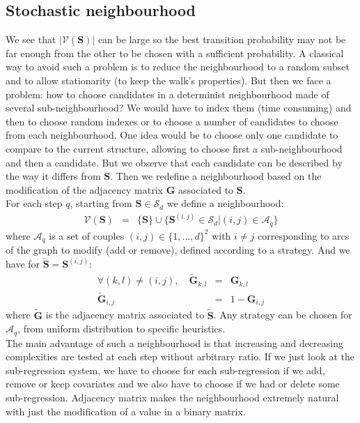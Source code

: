 \documentclass[12pt,a4paper]{report}
\begin{document}
	\subsection{Stochastic neighbourhood}
	We see that $|\mathcal{V}(\boldsymbol{S})|$ can be large so the best transition probability may not be far enough from the other to be chosen with a sufficient probability. A classical way to avoid such a problem is to reduce the neighbourhood to a random subset and to allow stationarity (to keep the walk's properties). But then we face a problem: how to choose candidates in a determinist neighbourhood made of several sub-neighbourhood? We would have to index them (time consuming) and then to choose random indexes or to choose a number of candidates to choose from each neighbourhood. One idea would be to choose only one candidate to compare to the current structure, allowing to choose first a sub-neighbourhood and then a candidate. But we observe that each candidate can be described by the way it differs from $\boldsymbol{S}$. Then we redefine a neighbourhood based on the modification of the adjacency matrix $\boldsymbol{G}$ associated to $\boldsymbol{S}$.\\
	
	For each step $q$, starting from $\boldsymbol{S} \in \mathcal{S}_d$ we define a neighbourhood:
		\begin{eqnarray}
		\mathcal{V}(\boldsymbol{S})&=& \{\boldsymbol{S} \}\cup \{ \boldsymbol{S}^{(i,j)} \in \mathcal{S}_d|(i,j) \in \mathcal{A}_q\} 
	\end{eqnarray}	
	where $\mathcal{A}_q$ is a set of couples $(i,j) \in \{1,\dots,d \}^2$ with $i\neq j$ corresponding to arcs of the graph to modify (add or remove), defined according to a strategy.
	And we have for  $\tilde{\boldsymbol{S}}=\boldsymbol{S}^{(i,j)}$:
	\begin{eqnarray}
		\forall (k,l)\neq (i,j), \quad	\tilde{\boldsymbol{G}}_{k,l}&=&\boldsymbol{G}_{k,l} \\
		\tilde{\boldsymbol{G}}_{i,j}&=&1-\boldsymbol{G}_{i,j} 
	\end{eqnarray}
	where $\tilde{\boldsymbol{G}}$ is the adjacency matrix associated to $\tilde{\boldsymbol{S}}$. Any strategy can be chosen for $\mathcal{A}_q$, from uniform distribution to specific heuristics.\\
	
The main advantage of such a neighbourhood is that increasing and decreasing complexities are tested at each step without arbitrary ratio. If we just look at the sub-regression system, we have to choose for each sub-regression if we add, remove or keep covariates and we also have to choose if we had or delete some sub-regression. Adjacency matrix makes the neighbourhood extremely natural with just the modification of a value in a binary matrix.
\end{document}
